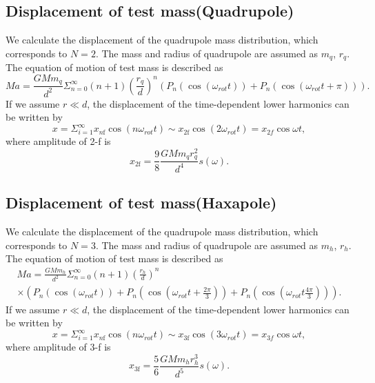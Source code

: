 \documentclass[12pt]{iopart}
\begin{document}
\subsection{Displacement of test mass(Quadrupole)} \label{Quad}
We calculate the displacement of the quadrupole mass distribution, which corresponds to $N=2$.
The mass and radius of quadrupole are assumed as $m_q$, $r_q$. 
The equation of motion of test mass is described as
\begin{equation}
Ma=\frac{GMm_q}{d^2}\Sigma^{\infty}_{n=0}(n+1) \left( \frac{r_q}{d} \right)^n \left( P_n\left(\cos{\left(\omega_{rot} t \right)}\right) + P_n\left(\cos{\left(\omega_{rot} t +\pi \right)}\right) \right).
\end{equation} 
If we assume $r \ll d$, the displacement of the time-dependent lower harmonics can be written by 
\begin{equation}
x=\Sigma_{i=1}^{\infty}x_{n\mathrm{f}}\cos(n\omega_{rot} t)\sim x_{2\mathrm{f}}\cos(2\omega_{rot} t)=x_{2f}\cos{\omega t},
\end{equation}
where amplitude of 2-f is
\begin{equation}
x_{2\mathrm{f}}=\frac{9}{8}\frac{GMm_{q}r_{q}^2}{d^4}s(\omega). \label{2f}
\end{equation}

\subsection{Displacement of test mass(Haxapole)} \label{Hexa}
We calculate the displacement of the quadrupole mass distribution, which corresponds to $N=3$.
The mass and radius of quadrupole are assumed as $m_h$, $r_h$. 
The equation of motion of test mass is described as
\begin{eqnarray}
Ma = \frac{GMm_h}{d^2}\Sigma^{\infty}_{n=0}(n+1) \left( \frac{r_h}{d} \right)^n \\
\times \left( P_n\left(\cos{\left(\omega_{rot} t \right)}\right) + P_n\left(\cos{\left(\omega_{rot} t+\frac{2\pi}{3} \right)} \right) + P_n\left(\cos{\left(\omega_{rot} t \frac{4\pi}{3} \right) }\right) \right).
\end{eqnarray} 
If we assume $r \ll d$, the displacement of the time-dependent lower harmonics can be written by 
\begin{equation}
x=\Sigma_{i=1}^{\infty}x_{n\mathrm{f}}\cos(n\omega_{rot} t)\sim  x_{3\mathrm{f}}\cos(3\omega_{rot} t)=x_{3f}\cos{\omega t},
\end{equation}
where amplitude of 3-f is
\begin{equation}
 x_{3\mathrm{f}}=\frac{5}{6}\frac{GMm_{h}r_{h}^3}{d^5}s(\omega). \label{3f}
\end{equation}
\end{document}
